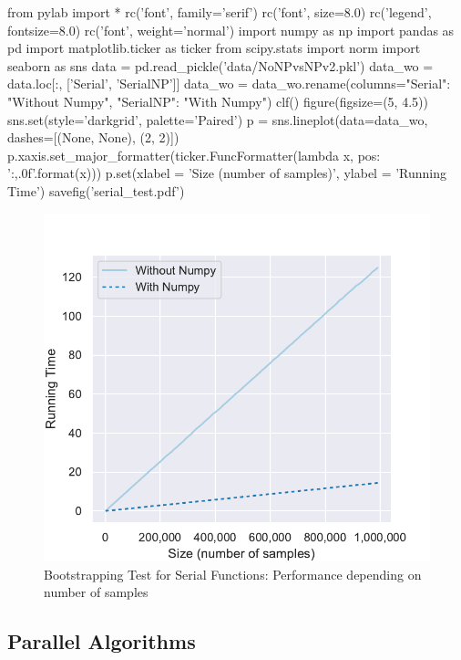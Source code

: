 \documentclass[11pt]{article}
\begin{document}
\medskip

\begin{pycode}
from pylab import *
rc('font', family='serif')
rc('font', size=8.0)
rc('legend', fontsize=8.0)
rc('font', weight='normal')
import numpy as np
import pandas as pd
import matplotlib.ticker as ticker
from scipy.stats import norm
import seaborn as sns
data = pd.read_pickle('data/NoNPvsNPv2.pkl')
data_wo = data.loc[:, ['Serial', 'SerialNP']]
data_wo = data_wo.rename(columns={"Serial": "Without Numpy", "SerialNP": "With Numpy"})
clf()
figure(figsize=(5, 4.5))
sns.set(style='darkgrid', palette='Paired')
p = sns.lineplot(data=data_wo, dashes=[(None, None), (2, 2)])
p.xaxis.set_major_formatter(ticker.FuncFormatter(lambda x, pos: '{:,.0f}'.format(x)))
p.set(xlabel = 'Size (number of samples)', ylabel = 'Running Time')
savefig('serial_test.pdf')
\end{pycode}

\begin{figure}[H]
    \begin{center}
        \includegraphics{serial_test.pdf}
    \end{center}
    \caption{Bootstrapping Test for Serial Functions: Performance depending on number of samples}\label{fig:SerialTest}
\end{figure}

\subsection{Parallel Algorithms}\label{subsec:parallel-algorithms}
\end{document}
